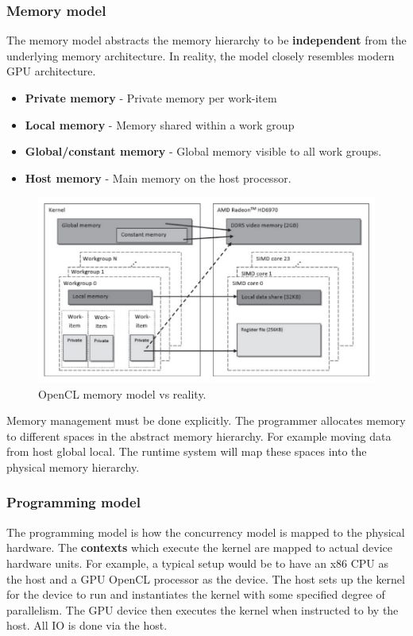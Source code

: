 \documentclass[11pt]{article}
\begin{document}
\subsubsection*{Memory model}
The memory model abstracts the memory hierarchy to be \textbf{independent} from the underlying memory architecture. In reality, the model closely resembles modern GPU architecture. 
\begin{itemize}
\item \textbf{Private memory} - Private memory per work-item
\item \textbf{Local memory} - Memory shared within a work group
\item \textbf{Global/constant memory} - Global memory visible to all work groups.
\item \textbf{Host memory} - Main memory on the host processor.
\end{itemize}
\begin{figure}[H]
\centering
\includegraphics[width=1\textwidth, keepaspectratio]{imgs/opencl-memory-model.png}
\caption{OpenCL memory model vs reality.}
\end{figure}
\noindent
Memory management must be done explicitly. The programmer allocates memory to different spaces in the abstract memory hierarchy. For example moving data from host \rightarrow global \rightarrow local. The runtime system will map these spaces into the physical memory hierarchy. 

\subsubsection*{Programming model}
The programming model is how the concurrency model is mapped to the physical hardware. The \textbf{contexts} which execute the kernel are mapped to actual device hardware units. 
\n
For example, a typical setup would be to have an x86 CPU as the host and a GPU OpenCL processor as the device. The host sets up the kernel for the device to run and instantiates the kernel with some specified degree of parallelism. The GPU device then executes the kernel when instructed to by the host. All IO is done via the host. 
\end{document}
